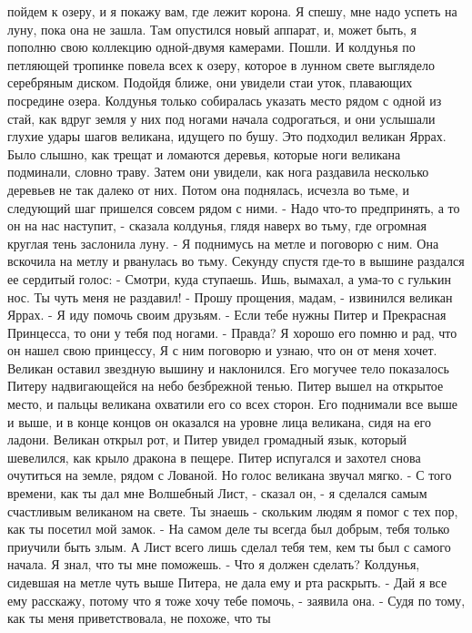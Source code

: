 пойдем к озеру, и я покажу вам, где лежит корона. Я спешу, мне надо 
успеть на луну, пока она не зашла. Там опустился новый аппарат, и, 
может быть, я пополню свою коллекцию одной-двумя камерами. Пошли.
    И колдунья по петляющей тропинке повела всех к озеру, которое в 
лунном свете выглядело серебряным диском. Подойдя ближе, они увидели 
стаи уток, плавающих посредине озера.
    Колдунья только собиралась указать место рядом с одной из стай, 
как вдруг земля у них под ногами начала содрогаться, и они услышали 
глухие удары шагов великана, идущего по бушу. Это подходил великан 
Яррах. Было слышно, как трещат и ломаются деревья, которые ноги 
великана подминали, словно траву.
    Затем они увидели, как нога раздавила несколько деревьев не так 
далеко от них. Потом она поднялась, исчезла во тьме, и следующий шаг 
пришелся совсем рядом с ними.
    - Надо что-то предпринять, а то он на нас наступит, - сказала 
колдунья, глядя наверх во тьму, где огромная круглая тень заслонила 
луну. - Я поднимусь на метле и поговорю с ним.
    Она вскочила на метлу и рванулась во тьму. Секунду спустя где-то в 
вышине раздался ее сердитый голос:
    - Смотри, куда ступаешь. Ишь, вымахал, а ума-то с гулькин нос. Ты 
чуть меня не раздавил!
    - Прошу прощения, мадам, - извинился великан Яррах. - Я иду помочь 
своим друзьям.
    - Если тебе нужны Питер и Прекрасная Принцесса, то они у тебя под 
ногами.
    - Правда? Я хорошо его помню и рад, что он нашел свою принцессу, Я 
с ним поговорю и узнаю, что он от меня хочет.
    Великан оставил звездную вышину и наклонился. Его могучее тело 
показалось Питеру надвигающейся на небо безбрежной тенью. Питер вышел 
на открытое место, и пальцы великана охватили его со всех сторон. Его 
поднимали все выше и выше, и в конце концов он оказался на уровне лица 
великана, сидя на его ладони. Великан открыл рот, и Питер увидел 
громадный язык, который шевелился, как крыло дракона в пещере. Питер 
испугался и захотел снова очутиться на земле, рядом с Лованой. Но 
голос великана звучал мягко.
    - С того времени, как ты дал мне Волшебный Лист, - сказал он, - я 
сделался самым счастливым великаном на свете. Ты знаешь - скольким 
людям я помог с тех пор, как ты посетил мой замок.
    - На самом деле ты всегда был добрым, тебя только приучили быть 
злым. А Лист всего лишь сделал тебя тем, кем ты был с самого начала. Я 
знал, что ты мне поможешь.
    - Что я должен сделать?
    Колдунья, сидевшая на метле чуть выше Питера, не дала ему и рта 
раскрыть.
    - Дай я все ему расскажу, потому что я тоже хочу тебе помочь, - 
заявила она.
    - Судя по тому, как ты меня приветствовала, не похоже, что ты 
